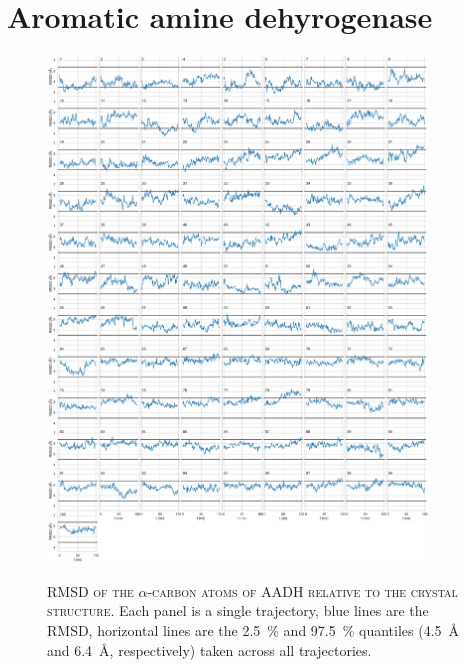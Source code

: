 \chapter{Aromatic amine dehyrogenase}\label{app:aadh}


\begin{figure}[ph!]
 \centering
 \caption[RMSD of the alpha-carbon atoms of AADH relative to the crystal structure]{\textsc{RMSD of the $\alpha$-carbon atoms of AADH relative to the crystal structure}. Each panel is a single trajectory, blue lines are the RMSD, horizontal lines are the \SI{2.5}{\percent} and \SI{97.5}{\percent} quantiles (\SI{4.5}{\angstrom} and \SI{6.4}{\angstrom}, respectively) taken across all trajectories.}
 \includegraphics[width=0.9\textwidth]{chapters/aadh/figures/rmsd_backbone_ca.pdf}
 \label{fig:rmsd_ca}
\end{figure}

